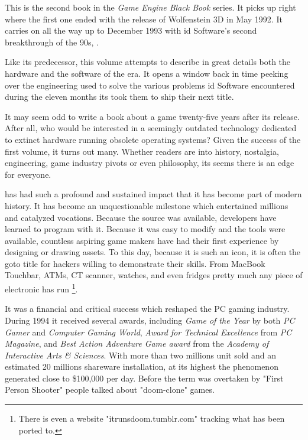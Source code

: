 This is the second book in the \textit{Game Engine Black Book} series. It picks up right where the first one ended with the release of Wolfenstein 3D in May 1992. It carries on all the way up to December 1993 with id Software's second breakthrough of the 90s, \doom{}.\\ %
\par
 Like its predecessor, this volume attempts to describe in great details both the hardware and the software of the era. It opens a window back in time peeking over the engineering used to solve the various problems id Software encountered during the eleven months its took them to ship their next title.\\%
\par
It may seem odd to write a book about a game twenty-five years after its release. After all, who would be interested in a seemingly outdated technology dedicated to extinct hardware running obsolete operating systems? Given the success of the first volume, it turns out many. Whether readers are into history, nostalgia, engineering, game industry pivots or even philosophy, its seems there is an edge for everyone.\\ 

\par
\doom{} has had such a profound and sustained impact that it has become part of modern history. It has become an unquestionable milestone which entertained millions and catalyzed vocations. Because the source was available, developers have learned to program with it. Because it was easy to modify and the tools were available, countless aspiring game makers have had their first experience by designing or drawing assets. To this day, because it is such an icon, it is often the goto title for hackers willing to demonstrate their skills. From MacBook Touchbar, ATMs, CT scanner, watches, and even fridges pretty much any piece of electronic has run \doom{}\footnote{There is even a website "itrunsdoom{}.tumblr.com" tracking what \doom{} has been ported to.}.\\
\par

It was a financial and critical success which reshaped the PC gaming industry. During 1994 it received several awards, including \textit{Game of the Year} by both \textit{PC Gamer} and \textit{Computer Gaming World}, \textit{Award for Technical Excellence} from \textit{PC Magazine}, and \textit{Best Action Adventure Game award} from the \textit{Academy of Interactive Arts \& Sciences}. With more than two millions unit sold and an estimated 20 millions shareware installation, at its highest the phenomenon generated close to \$100,000 per day. Before the term was overtaken by "First Person Shooter" people talked about "doom{}-clone" games.


